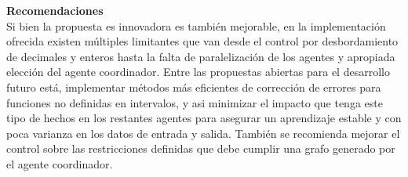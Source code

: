\textbf{ \Huge Recomendaciones} \\
    
    Si bien la propuesta es innovadora es también mejorable, en la implementación ofrecida existen múltiples limitantes que van desde el control por desbordamiento 
    de decimales y enteros hasta la falta de paralelización de los agentes y apropiada elección del agente coordinador. Entre las propuestas abiertas para el desarrollo 
    futuro está, implementar métodos más eficientes de corrección de errores para funciones no definidas en intervalos, y asi minimizar el impacto que tenga este tipo de 
    hechos en los restantes agentes para asegurar un aprendizaje estable y con poca varianza en los datos de entrada y salida. También se recomienda mejorar el control sobre 
    las restricciones definidas que debe cumplir una grafo generado por el agente coordinador.

